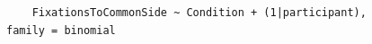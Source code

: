 \documentclass[12pt]{article}
\begin{document}
\begin{figure}[!ht]
	\centering
	\begin{BVerbatim}
	FixationsToCommonSide ~ Condition + (1|participant), family = binomial
	\end{BVerbatim}
\end{figure}


\end{document}
